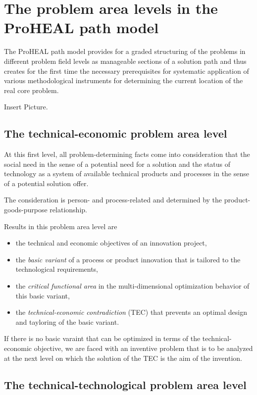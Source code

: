 \documentclass[11pt,a4paper]{article}
\begin{document}
\section{The problem area levels in the ProHEAL path model}

The ProHEAL path model provides for a graded structuring of the problems in
different problem field levels as manageable sections of a solution path and
thus creates for the first time the necessary prerequisites for systematic
application of various methodological instruments for determining the current
location of the real core problem.

Insert Picture.

\subsection{The technical-economic problem area level}

At this first level, all problem-determining facts come into consideration
that the social need in the sense of a potential need for a solution and the
status of technology as a system of available technical products and processes
in the sense of a potential solution offer.

The consideration is person- and process-related and determined by the
product-goods-purpose relationship.

Results in this problem area level are
\begin{itemize}
\item the technical and economic objectives of an innovation project,
\item the \emph{basic variant} of a process or product innovation that is
  tailored to the technological requirements,
\item the \emph{critical functional area} in the multi-dimensional
  optimization behavior of this basic variant,
\item the \emph{technical-economic contradiction} (TEC) that prevents an
  optimal design and tayloring of the basic variant.
\end{itemize}
If there is no basic varaint that can be optimized in terms of the
technical-economic objective, we are faced with an inventive problem that is
to be analyzed at the next level on which the solution of the TEC is the aim
of the invention.

\subsection{The technical-technological problem area level}
\end{document}
